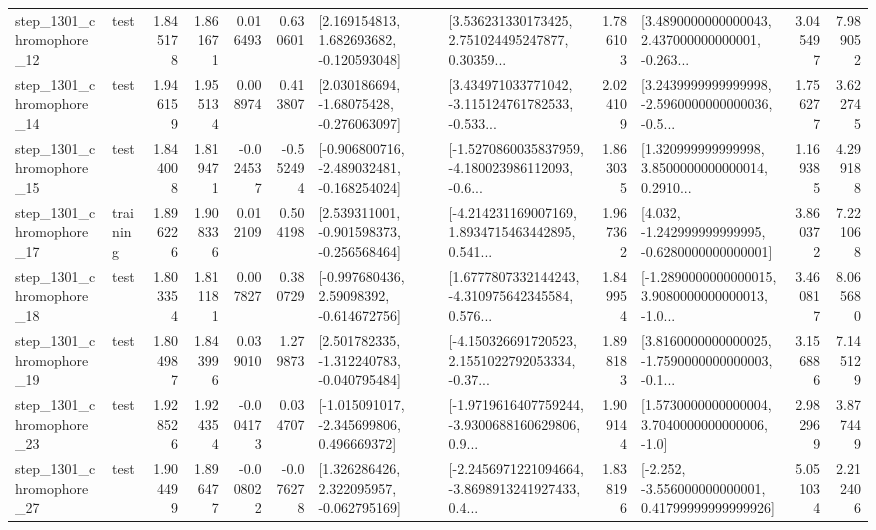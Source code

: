 \begin{tabular}{llrrrrllrlrr}
 step\_1301\_chromophore\_12 &      test &      1.845178 &    1.861671 &      0.016493 &  0.630601 &    [2.169154813, 1.682693682, -0.120593048] &  [3.536231330173425, 2.751024495247877, 0.30359... &       1.786103 &  [3.4890000000000043, 2.437000000000001, -0.263... &            3.045497 &          7.989052 \\
 step\_1301\_chromophore\_14 &      test &      1.946159 &    1.955134 &      0.008974 &  0.413807 &    [2.030186694, -1.68075428, -0.276063097] &  [3.434971033771042, -3.115124761782533, -0.533... &       2.024109 &  [3.2439999999999998, -2.5960000000000036, -0.5... &            1.756277 &          3.622745 \\
 step\_1301\_chromophore\_15 &      test &      1.844008 &    1.819471 &     -0.024537 & -0.552494 &  [-0.906800716, -2.489032481, -0.168254024] &  [-1.5270860035837959, -4.180023986112093, -0.6... &       1.863035 &  [1.320999999999998, 3.8500000000000014, 0.2910... &            1.169385 &          4.299188 \\
 step\_1301\_chromophore\_17 &  training &      1.896226 &    1.908336 &      0.012109 &  0.504198 &   [2.539311001, -0.901598373, -0.256568464] &  [-4.214231169007169, 1.8934715463442895, 0.541... &       1.967362 &   [4.032, -1.242999999999995, -0.6280000000000001] &            3.860372 &          7.221068 \\
 step\_1301\_chromophore\_18 &      test &      1.803354 &    1.811181 &      0.007827 &  0.380729 &    [-0.997680436, 2.59098392, -0.614672756] &  [1.6777807332144243, -4.310975642345584, 0.576... &       1.849954 &  [-1.2890000000000015, 3.9080000000000013, -1.0... &            3.460817 &          8.065680 \\
 step\_1301\_chromophore\_19 &      test &      1.804987 &    1.843996 &      0.039010 &  1.279873 &   [2.501782335, -1.312240783, -0.040795484] &  [-4.150326691720523, 2.1551022792053334, -0.37... &       1.898183 &  [3.8160000000000025, -1.7590000000000003, -0.1... &            3.156886 &          7.145129 \\
 step\_1301\_chromophore\_23 &      test &      1.928526 &    1.924354 &     -0.004173 &  0.034707 &   [-1.015091017, -2.345699806, 0.496669372] &  [-1.9719616407759244, -3.9300688160629806, 0.9... &       1.909144 &     [1.5730000000000004, 3.7040000000000006, -1.0] &            2.982969 &          3.877449 \\
 step\_1301\_chromophore\_27 &      test &      1.904499 &    1.896477 &     -0.008022 & -0.076278 &    [1.326286426, 2.322095957, -0.062795169] &  [-2.2456971221094664, -3.8698913241927433, 0.4... &       1.838196 &  [-2.252, -3.556000000000001, 0.41799999999999926] &            5.051034 &          2.212406 \\

\end{tabular}
